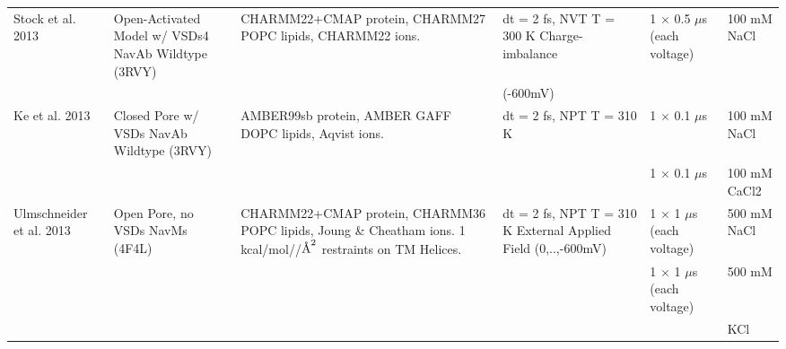\begin{refsection}
\begin{table}[]
\begin{threeparttable}
\begin{tabular}{ | p{1.5cm} | p{2.5cm} | p{3cm} | p{3cm} | p{2cm} | p{1cm} |}
Stock et al. 2013        & Open-Activated Model w/ VSDs4  NavAb Wildtype (3RVY)\tnote{1}             & CHARMM22+CMAP protein,\tnote{a} CHARMM27 POPC lipids,\tnote{b} CHARMM22 ions.\tnote{c}                                                                                        & dt = 2 fs, NVT T = 300 K  Charge-imbalance                     & 1 $\times$ 0.5 $\mu$s (each voltage) & 100 mM NaCl               \\
                         &                                                                   &                                                                                                                                                       & (-600mV)                                                       &                           &                           \\
Ke et al. 2013           & Closed Pore w/ VSDs  NavAb Wildtype (3RVY)\tnote{1}                                                       & AMBER99sb protein,\tnote{f} AMBER GAFF DOPC lipids,\tnote{g} Aqvist ions.\tnote{l}                                                                                            & dt = 2 fs, NPT T = 310 K                                       & 1 $\times$ 0.1 $\mu$s                & 100 mM NaCl               \\
                         &                                    &                                                                                                                                                       &                                                                & 1 $\times$ 0.1 $\mu$s                & 100 mM CaCl2              \\
Ulmschneider et al. 2013 & Open Pore, no VSDs  NavMs (4F4L)\tnote{3}                                                       & CHARMM22+CMAP protein,\tnote{a} CHARMM36 POPC lipids,\tnote{c} Joung \& Cheatham ions.\tnote{j}  1 kcal/mol//$\textup{\AA}^{2}$ restraints on TM Helices.              & dt = 2 fs, NPT T = 310 K  External Applied Field (0,..,-600mV) & 1 $\times$ 1 $\mu$s (each voltage)   & 500 mM NaCl               \\
                         &                                             &                                                                                                                                                       &                                                                & 1 $\times$ 1 $\mu$s (each voltage)   & 500 mM                    \\
                         &                                                                   &                                                                                                                                                       &                                                                &                           & KCl                       \\

\end{tabular}
\end{threeparttable}
\end{table}
\end{refsection}
